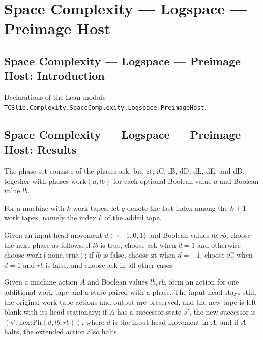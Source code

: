 \section{Space Complexity --- Logspace --- Preimage Host}
\subsection*{Space Complexity --- Logspace --- Preimage Host: Introduction}

Declarations of the Lean module \texttt{TCSlib.Complexity.SpaceComplexity.Logspace.PreimageHost}.

\subsection*{Space Complexity --- Logspace --- Preimage Host: Results}

\begin{definition}
\label{Complexity.LogProg.OIS.Ph}
\leanok
The phase set consists of the phases ask, bit, zt, iC, iB, dD, dL, dE, and dB, together
with phases $\mathrm{work}(a,lb)$ for each optional Boolean value $a$ and Boolean value $lb$.
\end{definition}

\begin{definition}
\label{Complexity.LogProg.OIS.q}
\leanok
For a machine with $k$ work tapes, let $q$ denote the last index among the $k+1$ work
tapes, namely the index $k$ of the added tape.
\end{definition}

\begin{definition}
\label{Complexity.LogProg.OIS.nextPh}
\leanok
{}
Given an input-head movement $d\in\{-1,0,1\}$ and Boolean values $lb,rb$, choose the
next phase as follows: if $lb$ is true, choose ask when $d=1$ and otherwise choose
work$(\mathrm{none},\mathrm{true})$; if $lb$ is false, choose zt when $d=-1$, choose
iC when $d=1$ and $rb$ is false, and choose ask in all other cases.
\end{definition}

\begin{definition}
\label{Complexity.LogProg.OIS.liftAct}
\leanok
{}
Given a machine action $A$ and Boolean values $lb,rb$, form an action for one additional
work tape and a state paired with a phase. The input head stays still, the original
work-tape actions and output are preserved, and the new tape is left blank with its head
stationary; if $A$ has a successor state $s'$, the new successor is
$(s',\mathrm{nextPh}(d,lb,rb))$, where $d$ is the input-head movement in $A$, and if $A$ halts,
the extended action also halts.
\end{definition}

